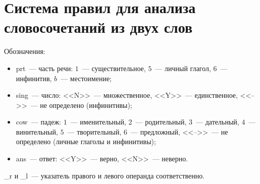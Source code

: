 \documentclass[main]{subfiles}
\begin{document}
\section{Система правил для анализа словосочетаний из двух слов}\label{app:B}

Обозначения:\begin{itemize}
	\item prt~--- часть речи: $1$~--- существительное, $5$~--- личный глагол, $6$~--- инфинитив, $b$~--- местоимение;
	\item sing~--- число: <<N>>~--- множественное, <<Y>>~--- единственное, <<-->>~--- не определено (инфинитивы);
	\item cow~--- падеж: $1$~--- именительный, $2$~--- родительный, $3$~--- дательный, $4$~--- винительный, $5$~--- творительный, $6$~--- предложный, <<-->>~--- не определено (личные глаголы и инфинитивы);
	\item ans~--- ответ: <<Y>>~--- верно, <<N>>~--- неверно.
\end{itemize}
\_r и \_l~--- указатель правого и левого операнда соответственно.
\end{document}

